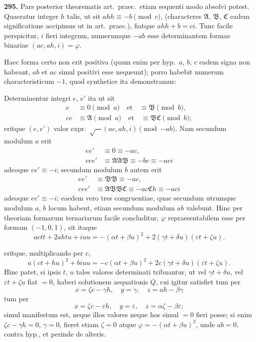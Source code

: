\documentclass[12pt,a4paper]{article}
\theoremstyle{plain}
\theoremstyle{definition}
\theoremstyle{remark}
\begin{document}
\textbf{295.} Pars posterior theorematis art.~praec.~etiam sequenti modo absolvi potest. Quaeratur integer $h$ talis, ut sit $ahh \equiv -b \pmod{c}$, (characteres $\mathfrak{A}$, $\mathfrak{B}$, $\mathfrak{C}$ eadem significatione accipimus ut in art.~praec.), fiatque $ahh + b = ci$. Tunc facile perspicitur, $i$ fieri integrum, numerumque $-ab$ esse determinantem formae binariae $(ac, ah, i) = \varphi$.

Haec forma certo non erit positiva (quum enim per hyp.~$a$, $b$, $c$ eadem signa non habeant, $ab$ et $ac$ simul positivi esse nequeunt); porro habebit numerum characteristicum $-1$, quod synthetice ita demonstramus:

Determinentur integri $e$, $e'$ ita ut sit
\begin{align*}
e &\equiv 0 \pmod{a} \quad\text{et}\quad \equiv \mathfrak{B} \pmod{b}, \\
ce &\equiv \mathfrak{A} \pmod{a} \quad\text{et}\quad \equiv \mathfrak{B}\mathfrak{C} \pmod{b};
\end{align*}
eritque $(e,e')$ valor expr.~$\surd{-}(ac, ah, i)\pmod{-ab}$. Nam secundum modulum $a$ erit
\begin{align*}
ee' &\equiv 0 \equiv -ac, \\
cee' &\equiv \mathfrak{A}\mathfrak{A}\mathfrak{B} \equiv -bc \equiv -aci
\end{align*}
adeoque $ee' \equiv -i$; secundum modulum $b$ autem erit
\begin{align*}
ee' &\equiv \mathfrak{B}\mathfrak{B} \equiv -ac, \\
cee' &\equiv \mathfrak{A}\mathfrak{B}\mathfrak{B}\mathfrak{C} \equiv -ac\mathfrak{C}h \equiv -aci
\end{align*}
adeoque $ee' \equiv -i$; eaedem vero tres congruentiae, quae secundum utrumque modulum $a$, $b$ locum habent, etiam secundum modulum $ab$ valebunt. Hinc per theoriam formarum ternariarum facile concluditur, $\varphi$ repraesentabilem esse per formam $(-1, 0, 1)$, sit itaque
\[
actt + 2ahtu + iuu = -(\alpha t + \beta u)^2 + 2(\gamma t + \delta u)(\varepsilon t + \zeta u).
\]

eritque, multiplicando per $c$,
\[
a(ct + hu)^2 + biuu = -c(\alpha t + \beta u)^2 + 2c(\gamma t + \delta u)(\varepsilon t + \zeta u).
\]
Hinc patet, si ipsis $t$, $u$ tales valores determinati tribuantur, ut vel $\gamma t + \delta u$, vel $\varepsilon t + \zeta u$ fiat $= 0$, haberi solutionem aequationis $Q$, cui igitur satisfiet tum per
\[
x = \zeta c - \gamma h,\quad y = \gamma,\quad z = ah - \beta\gamma
\]
tum per
\[
x = \zeta c - \varepsilon h,\quad y = \varepsilon,\quad z = \alpha\zeta - \beta\varepsilon;
\]
simul manifestum est, neque illos valores neque hos simul $= 0$ fieri posse; si enim $\zeta c - \gamma h = 0$, $\gamma = 0$, fieret etiam $\zeta = 0$ atque $\varphi = -(\alpha t + \beta u)^2$, unde $ab = 0$, contra hyp., et perinde de alteris.
\end{document}
